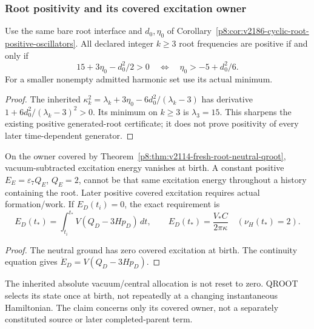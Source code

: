 \documentclass[12pt,a4paper]{article}
\begin{document}
\subsubsection{Root positivity and its covered excitation owner}
\begin{corollary}
\label{p8:cor:v2203-root-minimum-criterion}
Use the same bare root interface and $d_0,\eta_0$ of
Corollary~\ref{p8:cor:v2186-cyclic-root-positive-oscillators}.
All declared integer $k\ge3$ root frequencies are positive if and only if
\begin{equation}
\label{p8:eq:v2203-root-minimum-criterion}
 \boxed{15+3\eta_0-d_0^2/2>0}
 \quad\Longleftrightarrow\quad\eta_0>-5+d_0^2/6.
\end{equation}
For a smaller nonempty admitted harmonic set use its actual minimum.
\end{corollary}
\begin{proof}
The inherited $\kappa_k^2=\lambda_k+3\eta_0-6d_0^2/(\lambda_k-3)$
has derivative $1+6d_0^2/(\lambda_k-3)^2>0$.
Its minimum on $k\ge3$ is $\lambda_3=15$.
This sharpens the existing positive generated-root certificate; it
does not prove positivity of every later time-dependent generator.
\end{proof}

\begin{proposition}
\label{p8:prop:v2203-euler-root-excitation-obstruction}
On the owner covered by
Theorem~\ref{p8:thm:v2114-fresh-root-neutral-qroot},
vacuum-subtracted excitation energy vanishes at birth.
A constant positive $E_E=\varepsilon_7Q_E$, $Q_E=2$, cannot be that
same excitation energy throughout a history containing the root.
Later positive covered excitation requires actual formation/work.
If $E_D(t_i)=0$, the exact requirement is
\[
 E_D(t_*)=\int_{t_i}^{t_*}V(Q_D-3Hp_D)\,dt,\qquad
 E_D(t_*)=\frac{V_*C}{2\pi\kappa}\quad(\nu_H(t_*)=2).
\]
\end{proposition}
\begin{proof}
The neutral ground has zero covered excitation at birth.
The continuity equation gives $\dot E_D=V(Q_D-3Hp_D)$.
\end{proof}
The inherited absolute vacuum/central allocation is not reset to zero.
QROOT selects its state once at birth, not repeatedly at a changing
instantaneous Hamiltonian. The claim concerns only its covered owner,
not a separately constituted source or later completed-parent term.
\end{document}
